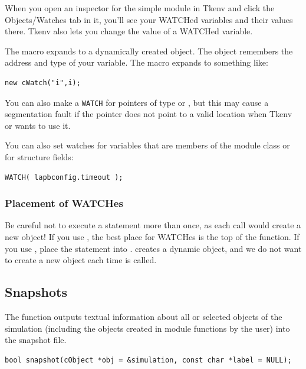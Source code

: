 When you open an inspector for the simple module in Tkenv and click
the Objects/Watches tab in it, you'll see your WATCHed variables
and their values there. Tkenv also lets you change the value of a
WATCHed variable.

The  macro expands to a dynamically created 
object.  The object remembers the address and type of your variable.
The macro expands to something like:

\begin{verbatim}
new cWatch("i",i);
\end{verbatim}


You can also make a \texttt{WATCH} for pointers of type  or
, but this may cause a segmentation fault if
the pointer does not point to a valid location when Tkenv or
 wants to use it.

You can also set watches for variables that are members of the
module class or for structure fields:

\begin{verbatim}
WATCH( lapbconfig.timeout );
\end{verbatim}


\subsubsection{Placement of WATCHes}


Be careful not to execute a  statement more than once,
as each call would create a new  object! If you use
, the best place for WATCHes is the top of the
 function.  If you use ,
place the  statement into .
 creates a dynamic  object, and we do
not want to create a new object each time  is
called.



\subsection{Snapshots}
\label{sec:ch-sim-lib:snapshots}

The  function outputs textual information about all
or selected objects of the simulation (including the objects created
in module functions by the user) into the snapshot file.

\begin{verbatim}
bool snapshot(cObject *obj = &simulation, const char *label = NULL);
\end{verbatim}


